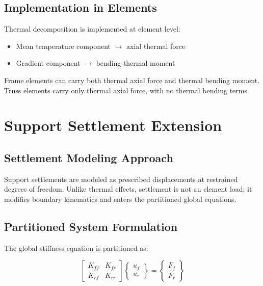 \subsection{Implementation in Elements}

Thermal decomposition is implemented at element level:

\begin{itemize}
    \item Mean temperature component $\rightarrow$ axial thermal force
    \item Gradient component $\rightarrow$ bending thermal moment
\end{itemize}

Frame elements can carry both thermal axial force and thermal bending moment. Truss elements carry only thermal axial force, with no thermal bending terms.

\pagebreak
\section{Support Settlement Extension}

\subsection{Settlement Modeling Approach}

Support settlements are modeled as prescribed displacements at restrained degrees of freedom. Unlike thermal effects, settlement is not an element load; it modifies boundary kinematics and enters the partitioned global equations.

\subsection{Partitioned System Formulation}

The global stiffness equation is partitioned as:

\begin{equation}
\begin{bmatrix}
K_{ff} & K_{fr} \\
K_{rf} & K_{rr}
\end{bmatrix}
\begin{Bmatrix}
u_f \\
u_r
\end{Bmatrix}
=
\begin{Bmatrix}
F_f \\
F_r
\end{Bmatrix}
\end{equation}

